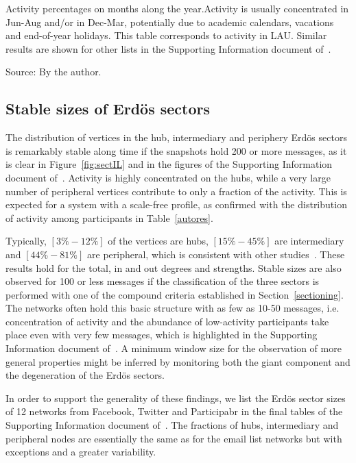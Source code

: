 \begin{table}
\caption{Activity percentages on months along the year.Activity is usually concentrated in Jun-Aug and/or in Dec-Mar, potentially due to academic calendars, vacations and end-of-year holidays. This table corresponds to activity in LAU. Similar results are shown for other lists in the Supporting Information document of~\cite{stab}.}
\footnotesize

\label{tab:min22}
\begin{flushleft}\footnotesize
Source: By the author.\
\end{flushleft}
\end{table}


\subsection{Stable sizes of Erd\"os sectors}\label{subsec:pih}

The distribution of vertices in the hub, intermediary and periphery Erd\"os sectors is remarkably stable along time if the snapshots hold 200 or more messages,
as it is clear in Figure~\ref{fig:sectIL} and in the figures of the Supporting Information document of~\cite{stab}.
Activity is highly concentrated on the hubs, while a very large number of peripheral vertices contribute to only a fraction of the activity.
This is expected for a system with a scale-free profile, as confirmed with the distribution of activity among participants in Table~\ref{autores}.

Typically, $[3\%-12\%]$ of the vertices are hubs,
$[15\%-45\%]$ are intermediary and $[44\%-81\%]$ are peripheral,
which is consistent with other studies~\cite{secFree}.
These results hold for the total, in and out degrees and strengths.
Stable sizes are also observed for 100 or less messages if the classification 
of the three sectors is performed with one of the compound criteria established in Section~\ref{sectioning}. The networks often hold this basic structure with as few as 10-50 messages, i.e. concentration of activity and the abundance of low-activity participants take place even with very few messages, which is highlighted in the Supporting Information document of~\cite{stab}.
A minimum window size for the observation of more general properties might be inferred by monitoring 
both the giant component and the degeneration of the Erd\"os sectors.

In order to support the generality of these findings,
we list the Erd\"os sector sizes of 12 networks from Facebook, Twitter and Participabr in the final tables of the
Supporting Information document of~\cite{stab}.
The fractions of hubs, intermediary and peripheral nodes are
essentially the same as for the email list networks but with exceptions and a greater variability.

